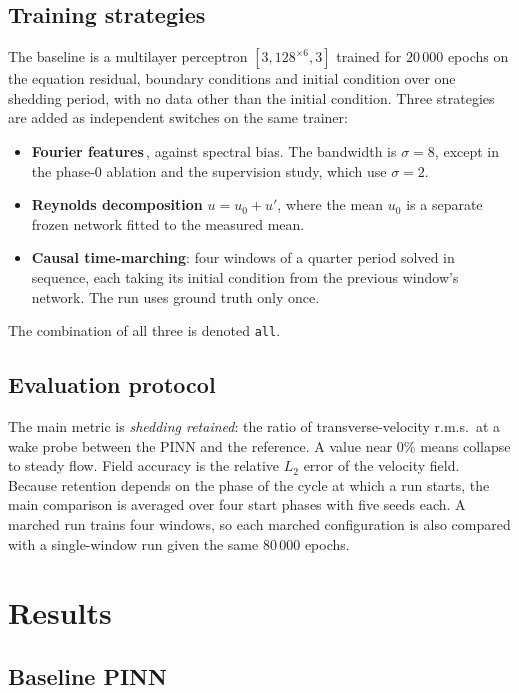 \documentclass[11pt,a4paper]{article}
\begin{document}
\subsection{Training strategies}

The baseline is a multilayer perceptron $[3, 128^{\times 6}, 3]$ trained for
$20\,000$ epochs on the equation residual, boundary conditions and initial
condition over one shedding period, with no data other than the initial
condition. Three strategies are added as independent switches on the same
trainer:
\begin{itemize}
  \item \textbf{Fourier features}\,\cite{tancik2020}, against spectral bias.
        The bandwidth is $\sigma = 8$, except in the phase-0 ablation and the
        supervision study, which use $\sigma = 2$.
  \item \textbf{Reynolds decomposition} $u = u_0 + u'$, where the mean $u_0$
        is a separate frozen network fitted to the measured mean.
  \item \textbf{Causal time-marching}: four windows of a quarter period
        solved in sequence, each taking its initial condition from the
        previous window's network. The run uses ground truth only once.
\end{itemize}
The combination of all three is denoted \texttt{all}.

\subsection{Evaluation protocol}

The main metric is \emph{shedding retained}: the ratio of transverse-velocity
r.m.s.\ at a wake probe between the PINN and the reference. A value near 0\%
means collapse to steady flow. Field accuracy is the relative $L_2$ error of
the velocity field. Because retention depends on the phase of the cycle at
which a run starts, the main comparison is averaged over four start phases
with five seeds each. A marched run trains four windows, so each marched
configuration is also compared with a single-window run given the same
$80\,000$ epochs.

\section{Results}
\label{sec:results}

\subsection{Baseline PINN}
\end{document}

